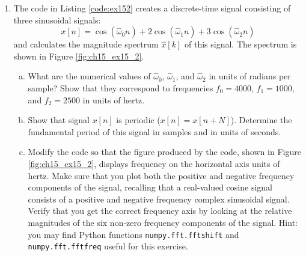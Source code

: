 \begin{enumerate}
\item The code in Listing \ref{code:ex152} creates a discrete-time signal consisting of three sinusoidal signals:
\begin{equation}
x[n]=\cos(\hat{\omega}_0 n)+2\cos(\hat{\omega}_1 n)+3\cos(\hat{\omega}_2 n)
\label{eq:ex15_2}
\end{equation}
and calculates the magnitude spectrum $\hat{x}[k]$ of this signal. The spectrum is shown in Figure \ref{fig:ch15_ex15_2}.



\begin{enumerate}[a)]
    \item What are the numerical values of $\hat{\omega}_0$, $\hat{\omega}_1$, and $\hat{\omega}_2$ in units of radians per sample? Show that they correspond to frequencies $f_0=4000$, $f_1=1000$, and $f_2=2500$ in units of hertz.
    \item Show that signal $x[n]$ is periodic ($x[n]=x[n+N]$). Determine the fundamental period of this signal in samples and in units of seconds. 
    \item Modify the code so that the figure produced by the code, shown in Figure \ref{fig:ch15_ex15_2}, displays frequency on the horizontal axis units of hertz. Make sure that you plot both the positive and negative frequency components of the signal, recalling that a real-valued cosine signal consists of a positive and negative frequency complex sinusoidal signal. Verify that you get the correct frequency axis by looking at the relative magnitudes of the six non-zero frequency components of the signal. Hint: you may find Python functions \verb|numpy.fft.fftshift| and \verb|numpy.fft.fftfreq| useful for this exercise.
\end{enumerate}



\end{enumerate}
